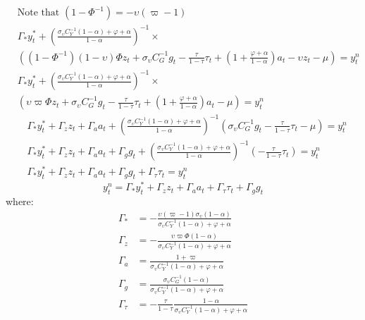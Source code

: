 \begin{align}
    &\text{Note that $(1 - \Phi^{-1}) = -\upsilon(\varpi - 1)$} \nonumber\\
    &\Gamma_* y^*_t + \left(\frac{\sigma_\upsilon C_Y^{-1}(1-\alpha) + \varphi + \alpha}{1-\alpha}\right)^{-1}\times\nonumber \\ 
        &\left((1 - \Phi^{-1}) (1-\upsilon)\Phi z_t + \sigma_\upsilon C_G^{-1} g_t - \frac{\tau}{1-\tau}\tau_t  + \left(1 + \frac{\varphi + \alpha}{1-\alpha}\right)a_t - \upsilon z_t -\mu \right)= y^n_t\\
    &\Gamma_* y^*_t + \left(\frac{\sigma_\upsilon C_Y^{-1}(1-\alpha) + \varphi + \alpha}{1-\alpha}\right)^{-1}\times\nonumber \\ 
        &\left(\upsilon \varpi \Phi z_t + \sigma_\upsilon C_G^{-1} g_t - \frac{\tau}{1-\tau}\tau_t  + \left(1 + \frac{\varphi + \alpha}{1-\alpha}\right)a_t -\mu \right)= y^n_t
\end{align}
\begin{align}
    &\Gamma_* y^*_t + \Gamma_z z_t + \Gamma_a a_t + \left(\frac{\sigma_\upsilon C_Y^{-1}(1-\alpha) + \varphi + \alpha}{1-\alpha}\right)^{-1}\left(\sigma_\upsilon C_G^{-1} g_t - \frac{\tau}{1-\tau}\tau_t -\mu \right)= y^n_t\\
    &\Gamma_* y^*_t + \Gamma_z z_t + \Gamma_a a_t + \Gamma_g g_t + \left(\frac{\sigma_\upsilon C_Y^{-1}(1-\alpha) + \varphi + \alpha}{1-\alpha}\right)^{-1}\left(- \frac{\tau}{1-\tau}\tau_t \right)= y^n_t\\
    &\Gamma_* y^*_t + \Gamma_z z_t + \Gamma_a a_t + \Gamma_g g_t + \Gamma_\tau \tau_t = y^n_t
\end{align}
\begin{equation}
    y^n_t = \Gamma_* y^*_t + \Gamma_z z_t + \Gamma_a a_t + \Gamma_\tau \tau_t + \Gamma_g g_t
\end{equation}
where:
\begin{align}
    \Gamma_* &= -\frac{\upsilon(\varpi - 1)\sigma_\upsilon(1-\alpha)}{\sigma_\upsilon C_Y^{-1} (1-\alpha) + \varphi + \alpha} \\
    \Gamma_z &= -\frac{\upsilon \varpi \Phi (1-\alpha)}{\sigma_\upsilon C_Y^{-1} (1-\alpha) + \varphi + \alpha} \\
    \Gamma_a &= \frac{1+\varpi}{\sigma_\upsilon C_Y^{-1} (1-\alpha) + \varphi + \alpha} \\
    \Gamma_g &= \frac{\sigma_\upsilon C_G^{-1} (1-\alpha)}{\sigma_\upsilon C_Y^{-1} (1-\alpha) + \varphi + \alpha} \\
    \Gamma_\tau &= -\frac{\tau}{1-\tau} \frac{1-\alpha}{\sigma_\upsilon C_Y^{-1} (1-\alpha) + \varphi + \alpha } \label{eq:appendix_natural_level_of_output_end}
\end{align}
\newpage